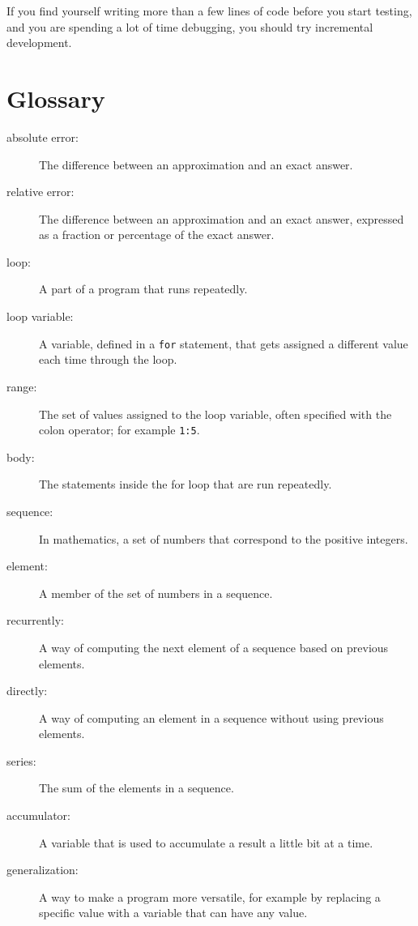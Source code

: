 \documentclass[
]{book}
\numberwithin{Answer}{chapter}
\numberwithin{Exercise}{chapter}
\begin{document}
If you find yourself writing more than a few lines of code before
you start testing, and you are spending a lot of time debugging,
you should try incremental development.


\section{Glossary}

\begin{description}

\item[absolute error:] The difference between an approximation and
an exact answer.

\item[relative error:] The difference between an approximation and
an exact answer, expressed as a fraction or percentage of the exact
answer.

\item[loop:] A part of a program that runs repeatedly.

\item[loop variable:] A variable, defined in a {\tt for} statement,
that gets assigned a different value each time through the loop.

\item[range:] The set of values assigned to the loop variable, often
specified with the colon operator; for example {\tt 1:5}.

\item[body:] The statements inside the for loop that are run
repeatedly.

\item[sequence:] In mathematics, a set of numbers that correspond
to the positive integers.

\item[element:] A member of the set of numbers in a sequence.

\item[recurrently:] A way of computing the next element of a sequence
based on previous elements.

\item[directly:] A way of computing an element in a sequence without
using previous elements.

\item[series:] The sum of the elements in a sequence.

\item[accumulator:] A variable that is used to accumulate a result
a little bit at a time.

\item[generalization:] A way to make a program more versatile, for
example by replacing a specific value with a variable that can have
any value.

\end{description}
\end{document}
